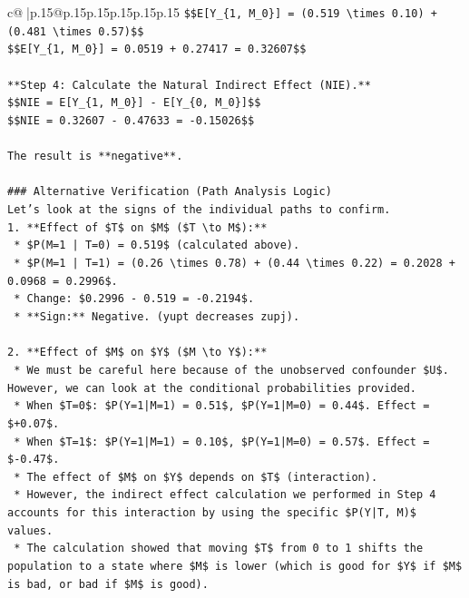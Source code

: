 \documentclass{article}
\begin{document}
{\begin{supertabular}{c@{$\;$}|p{.15\linewidth}@{}p{.15\linewidth}p{.15\linewidth}p{.15\linewidth}p{.15\linewidth}p{.15\linewidth}}
{{{\texttt{\$\$E{[}Y\_\{1, M\_0\}{]} = (0.519 \textbackslash{}times 0.10) + (0.481 \textbackslash{}times 0.57)\$\$} \\
\texttt{\$\$E{[}Y\_\{1, M\_0\}{]} = 0.0519 + 0.27417 = 0.32607\$\$} \\
\\ 
\texttt{**Step 4: Calculate the Natural Indirect Effect (NIE).**} \\
\texttt{\$\$NIE = E{[}Y\_\{1, M\_0\}{]} {-} E{[}Y\_\{0, M\_0\}{]}\$\$} \\
\texttt{\$\$NIE = 0.32607 {-} 0.47633 = {-}0.15026\$\$} \\
\\ 
\texttt{The result is **negative**.} \\
\\ 
\texttt{\#\#\# Alternative Verification (Path Analysis Logic)} \\
\texttt{Let's look at the signs of the individual paths to confirm.} \\
\texttt{1.  **Effect of \$T\$ on \$M\$ (\$T \textbackslash{}to M\$):**} \\
\texttt{    *   \$P(M=1 | T=0) = 0.519\$ (calculated above).} \\
\texttt{    *   \$P(M=1 | T=1) = (0.26 \textbackslash{}times 0.78) + (0.44 \textbackslash{}times 0.22) = 0.2028 + 0.0968 = 0.2996\$.} \\
\texttt{    *   Change: \$0.2996 {-} 0.519 = {-}0.2194\$.} \\
\texttt{    *   **Sign:** Negative. (yupt decreases zupj).} \\
\\ 
\texttt{2.  **Effect of \$M\$ on \$Y\$ (\$M \textbackslash{}to Y\$):**} \\
\texttt{    *   We must be careful here because of the unobserved confounder \$U\$. However, we can look at the conditional probabilities provided.} \\
\texttt{    *   When \$T=0\$: \$P(Y=1|M=1) = 0.51\$, \$P(Y=1|M=0) = 0.44\$. Effect = \$+0.07\$.} \\
\texttt{    *   When \$T=1\$: \$P(Y=1|M=1) = 0.10\$, \$P(Y=1|M=0) = 0.57\$. Effect = \${-}0.47\$.} \\
\texttt{    *   The effect of \$M\$ on \$Y\$ depends on \$T\$ (interaction).} \\
\texttt{    *   However, the indirect effect calculation we performed in Step 4 accounts for this interaction by using the specific \$P(Y|T, M)\$ values.} \\
\texttt{    *   The calculation showed that moving \$T\$ from 0 to 1 shifts the population to a state where \$M\$ is lower (which is good for \$Y\$ if \$M\$ is bad, or bad if \$M\$ is good).} \\
}}}
\end{supertabular}}
\end{document}
